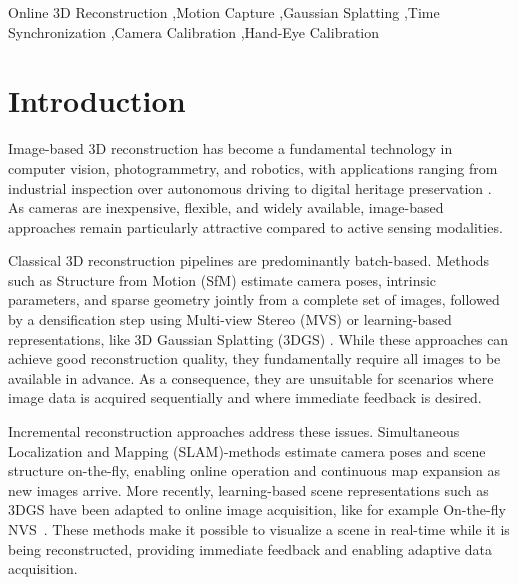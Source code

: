 \documentclass[a4paper,fleqn]{cas-dc}
\begin{document}
\begin{keywords}
Online 3D Reconstruction \sep Motion Capture \sep Gaussian Splatting \sep Time Synchronization \sep Camera Calibration \sep Hand-Eye Calibration
\end{keywords}

\maketitle

\section{Introduction}\label{sec:introduction}
Image-based 3D reconstruction has become a fundamental technology in computer vision, photogrammetry, and robotics, with applications ranging from industrial inspection \cite{steger_machine_2018} over autonomous driving \cite{behley_efficient_2018} to digital heritage preservation \cite{gomes_3d_2014}. As cameras are inexpensive, flexible, and widely available, image-based approaches remain particularly attractive compared to active sensing modalities.

Classical 3D reconstruction pipelines are predominantly batch-based. Methods such as Structure from Motion (SfM) \cite{schonberger_structure--motion_2016} estimate camera poses, intrinsic parameters, and sparse geometry jointly from a complete set of images, followed by a densification step using Multi-view Stereo (MVS) \cite{schonberger_pixelwise_2016} or learning-based representations, like 3D Gaussian Splatting (3DGS) \cite{kerbl_3d_2023}. While these approaches can achieve good reconstruction quality, they fundamentally require all images to be available in advance. As a consequence, they are unsuitable for scenarios where image data is acquired sequentially and where immediate feedback is desired.

Incremental reconstruction approaches address these issues. Simultaneous Localization and Mapping (SLAM)-methods \cite{cadena_past_2016}  estimate camera poses and scene structure on-the-fly, enabling online operation and continuous map expansion as new images arrive. More recently, learning-based scene representations such as 3DGS have been adapted to online image acquisition, like for example On-the-fly NVS~\cite{meuleman_--fly_2025}. These methods make it possible to visualize a scene in real-time while it is being reconstructed, providing immediate feedback and enabling adaptive data acquisition.
\end{document}
